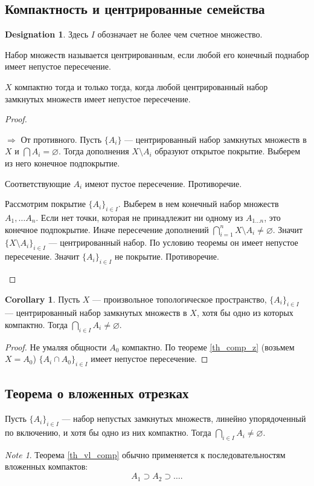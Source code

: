\documentclass[11pt]{book}
\theoremstyle{definition}
\theoremstyle{plain}
\theoremstyle{plain}
\theoremstyle{definition}
\newtheorem*{cor}{Corollary}
\newtheorem*{name}{Designation}
\theoremstyle{remark}
\newtheorem*{note}{Note}
\begin{document}
\subsection{Компактность и центрированные семейства}
\begin{name}
    Здесь $ I$ обозначает не более чем счетное множество.
\end{name}
\begin{defn}
    Набор множеств называется  {\sf центрированным}, если любой его конечный поднабор имеет непустое пересечение.
\end{defn}
\begin{thm}\label{th_comp_z}
    $ X$ компактно тогда и только тогда, когда любой центрированный набор замкнутых множеств имеет непустое пересечение.
\end{thm}
\begin{proof}
    $ $
    \begin{description}
	\item $ \boxed{ \Longrightarrow }$ От противного. Пусть $ \{A_i\}$ --- центрированный набор замкнутых множеств в $ X$ и  $ \bigcap A_i= \varnothing $. Тогда дополнения $ X \setminus A_i$ образуют открытое покрытие. Выберем из него конечное подпокрытие.

	    Соответствующие $ A_i$ имеют пустое пересечение.  Противоречие.
	\item \boxed {\Longleftarrow} Рассмотрим покрытие $ \{A_i\}_{i \in I}$. Выберем в нем конечный набор множеств $ A_1, \ldots A_n$. Если нет точки, которая не принадлежит ни одному из $ A_{1 \ldots  n}$, это конечное подпокрытие. Иначе пересечение дополнений $ \bigcap_{i=1}^{n}X \setminus  A_i \ne \varnothing$. Значит $ \{X \setminus A_i\}_{i \in I}$ --- центрированный набор. По условию теоремы он имеет непустое пересечение. Значит $ \{A_i\}_{i \in I} $ не покрытие. Противоречие.
    \end{description}
\end{proof}
\begin{cor}
    Пусть $ X$ --- произвольное  топологическое пространство, $ \{A_i\}_{i \in I}$ --- центрированный набор замкнутых множеств в $ X$, хотя бы одно из которых компактно.
    Тогда  $ \bigcap_{i \in  I} A_i \ne \varnothing$.
\end{cor}
\begin{proof}
    Не умаляя общности $ A_0$ компактно. По теореме \ref{th_comp_z} (возьмем $ X=A_0$)  $ \{A_i \cap A_0\}_{i \in  I}$ имеет непустое пересечение.
\end{proof}
\subsection{Теорема о вложенных отрезках}
\begin{thm}\label{th_vl_comp}
    Пусть $ \{A_i\}_{i \in  I}$ --- набор непустых замкнутых множеств, линейно упорядоченный по включению, и хотя бы одно из них компактно.
    Тогда $ \bigcap_{i \in  I} A_i \ne \varnothing $.
\end{thm}
\begin{note}
    Теорема \ref{th_vl_comp} обычно применяется к последовательностям вложенных компактов:
    \[
	A_1 \supset A_2 \supset \ldots
    .\]
\end{note}
\end{document}
